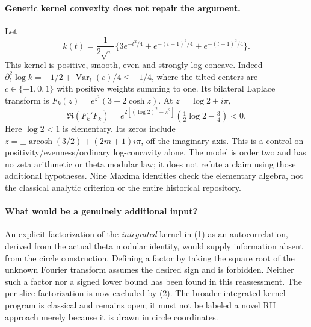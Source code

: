 \paragraph{Generic kernel convexity does not repair the argument.}
Let
\[
 k(t)=\frac1{2\sqrt\pi}\{3e^{-t^2/4}+e^{-(t-1)^2/4}+e^{-(t+1)^2/4}\}.
\]
This kernel is positive, smooth, even and strongly log-concave. Indeed
$\partial_t^2\log k=-1/2+\operatorname{Var}_t(c)/4\le-1/4$,
where the tilted centers are $c\in\{-1,0,1\}$ with positive weights
summing to one. Its bilateral Laplace transform is
$F_k(z)=e^{z^2}(3+2\cosh z)$. At $z=\log2+i\pi$,
\[
 \Re(F_k'\overline{F_k})
  =e^{2[(\log2)^2-\pi^2]}(\tfrac12\log2-\tfrac34)<0.
\]
Here $\log2<1$ is elementary. Its zeros include
$z=\pm\operatorname{arcosh}(3/2)+(2m+1)i\pi$, off the imaginary axis.
This is a control on positivity/evenness/ordinary log-concavity alone.
The model is order two and has no zeta arithmetic or theta modular law;
it does not refute a claim using those additional hypotheses. Nine
Maxima identities check the elementary algebra, not the classical
analytic criterion or the entire historical repository.

\paragraph{What would be a genuinely additional input?}
An explicit factorization of the \emph{integrated} kernel in (1) as an
autocorrelation, derived from the actual theta modular identity, would
supply information absent from the circle construction. Defining a
factor by taking the square root of the unknown Fourier transform assumes
the desired sign and is forbidden. Neither such a factor nor a signed
lower bound has been found in this reassessment. The per-slice factorization
is now excluded by (2). The broader integrated-kernel program is classical
and remains open; it must not be labeled a novel RH approach merely
because it is drawn in circle coordinates.

